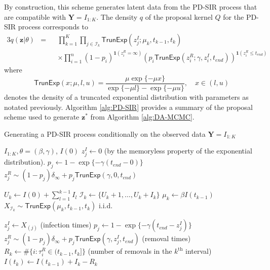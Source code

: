 \documentclass[12pt]{article}
\begin{document}
By construction, this scheme generates latent data from the PD-SIR process that are compatible with $\mathbf{Y} = I_{1:K}$. The density $q$ of the proposal kernel $Q$ for the PD-SIR process corresponds to
\begin{alignat}{3}
	\label{eq:q}
	q(\mathbf{z}|\theta) 
	& = && \prod_{k=1}^K \prod_{j\in\mathcal{I}_k} \textsf{TrunExp}(z^I_j; \mu_{k}, t_{k-1}, t_{k}) \\
	& && \times \prod_{i=1}^{n} \left( 1 - p_i \right)^{\mathbf{1}(z^R_i = \infty)} \left( p_i \textsf{TrunExp}(z^R_i; \gamma, z^I_i, t_{end}) \right)^{\mathbf{1}(z^R_i \le t_{end})}  \nonumber
\end{alignat}
where %
$$\textsf{TrunExp}(x; \mu, l, u) = \dfrac{\mu \exp\{-\mu x\}}{\exp\{-\mu l\} - \exp\{-\mu u\}}, \quad x \in (l, u)$$
denotes the density of a truncated exponential distribution with parameters as notated previously. Algorithm \ref{alg:PD-SIR} provides a summary of the proposal scheme used to generate $\mathbf{z^\ast}$ from Algorithm \ref{alg:DA-MCMC}.

\begin{algorithm}
	\caption{Generating a PD-SIR process conditionally on the observed data $\mathbf{Y} = I_{1:K}$}
	\label{alg:PD-SIR}
	\begin{algorithmic}
		\REQUIRE $I_{1:K}, \theta = (\beta, \gamma)$, $I(0)$
		\STATE $z^I_j \leftarrow 0$ (by the memoryless property of the exponential distribution).
		\STATE $p_j \leftarrow 1 - \exp\{-\gamma (t_{end} - 0)\}$
		\STATE $z^R_j \sim (1 - p_j) \delta_\infty + p_j \textsf{TrunExp}(\gamma, 0, t_{end})$
		\ENDFOR
		
		\STATE $U_k \leftarrow I(0) + \sum_{l=1}^{k-1} I_l$
		\STATE $\mathcal{I}_k \leftarrow \{U_k + 1, \dots, U_k + I_k\}$
		\STATE $\mu_k \leftarrow \beta I(t_{k-1})$
		\STATE $X_{\mathcal{I}_k} \sim \textsf{TrunExp}(\mu_k, t_{k-1}, t_k)$ i.i.d.\
		
		\STATE $z^I_j \leftarrow X_{(j)}$ (infection times)
		\STATE $p_j \leftarrow 1 - \exp\{-\gamma(t_{end} - z^I_j)\}$
		\STATE $z^R_j \sim (1 - p_j) \delta_\infty + p_j \textsf{TrunExp}(\gamma, z^I_j, t_{end})$ (removal times)
		\ENDFOR
		\STATE $R_k \leftarrow \#\{i:\tau^R_i \in (t_{k-1}, t_k]\}$ (number of removals in the $k^{\text{th}}$ interval)
		\STATE $I(t_k) \leftarrow I(t_{k-1}) + I_k - R_k$
		\ENDFOR
	\end{algorithmic}
\end{algorithm}
\end{document}
